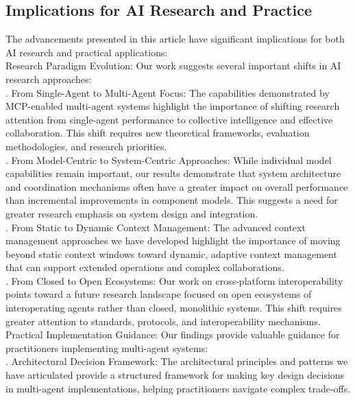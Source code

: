 \subsection{Implications for AI Research and Practice}
The advancements presented in this article have significant implications for both AI research and practical applications:\\ \newline
Research Paradigm Evolution: Our work suggests several important shifts in AI research approaches:\\ . From Single-Agent to Multi-Agent Focus: The capabilities demonstrated by MCP-enabled multi-agent systems highlight the importance of shifting research attention from single-agent performance to collective intelligence and effective collaboration. This shift requires new theoretical frameworks, evaluation methodologies, and research priorities.\\ . From Model-Centric to System-Centric Approaches: While individual model capabilities remain important, our results demonstrate that system architecture and coordination mechanisms often have a greater impact on overall performance than incremental improvements in component models. This suggests a need for greater research emphasis on system design and integration.\\ . From Static to Dynamic Context Management: The advanced context management approaches we have developed highlight the importance of moving beyond static context windows toward dynamic, adaptive context management that can support extended operations and complex collaborations.\\ . From Closed to Open Ecosystems: Our work on cross-platform interoperability points toward a future research landscape focused on open ecosystems of interoperating agents rather than closed, monolithic systems. This shift requires greater attention to standards, protocols, and interoperability mechanisms.\\ \newline
Practical Implementation Guidance: Our findings provide valuable guidance for practitioners implementing multi-agent systems:\\ . Architectural Decision Framework: The architectural principles and patterns we have articulated provide a structured framework for making key design decisions in multi-agent implementations, helping practitioners navigate complex trade-offs.\\ \newline
